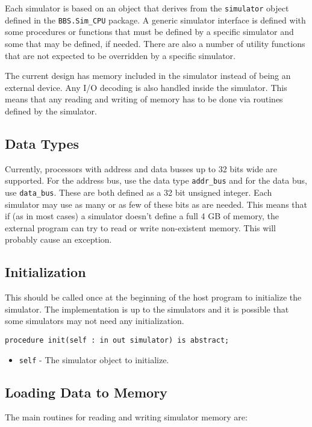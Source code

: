 \documentclass[10pt, openany]{book}
\newcommand{\package}[1]{\texttt{#1}}
\newcommand{\keyword}[1]{\texttt{#1}}
\newcommand{\datatype}[1]{\texttt{#1}}
\begin{document}
Each simulator is based on an object that derives from the \datatype{simulator} object defined in the \package{BBS.Sim\_CPU} package.  A generic simulator interface is defined with some procedures or functions that must be defined by a specific simulator and some that may be defined, if needed.  There are also a number of utility functions that are not expected to be overridden by a specific simulator.

The current design has memory included in the simulator instead of being an external device.  Any I/O decoding is also handled inside the simulator.  This means that any reading and writing of memory has to be done via routines defined by the simulator.

\subsection{Data Types}
Currently, processors with address and data busses up to 32 bits wide are supported.  For the address bus, use the data type \datatype{addr\_bus}  and for the data bus, use \datatype{data\_bus}.  These are both defined as a 32 bit unsigned integer.  Each simulator may use as many or as few of these bits as are needed.  This means that if (as in most cases) a simulator doesn't define a full 4 GB of memory, the external program can try to read or write non-existent memory.  This will probably cause an exception.

\subsection{Initialization}
This should be called once at the beginning of the host program to initialize the simulator.  The implementation is up to the simulators and it is possible that some simulators may not need any initialization.
\begin{lstlisting}
procedure init(self : in out simulator) is abstract;
\end{lstlisting}
\begin{itemize}
  \item \keyword{self} - The simulator object to initialize.
\end{itemize}

\subsection{Loading Data to Memory}
The main routines for reading and writing simulator memory are:
\end{document}

